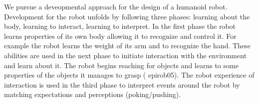 We pursue a deveopmental approach for the design of a humanoid robot. Development for the robot unfolds by following three phases: learning about the body, learning to interact, learning to interpret. In the first phase the robot learns properties of its own body allowing it to recognize and control it. For example the robot learns the weight of its arm and to recognize the hand. These abilities are used in the next phase to initiate interaction with the environment and learn about it. The robot begins reaching for objects and learns to some properties of the objects it manages to grasp (\cite{natale04learning,natale05exploring} epirob05). The robot experience of interaction is used in the third phase to interpret events around the robot by matching expectations and perceptions (poking/pushing).

